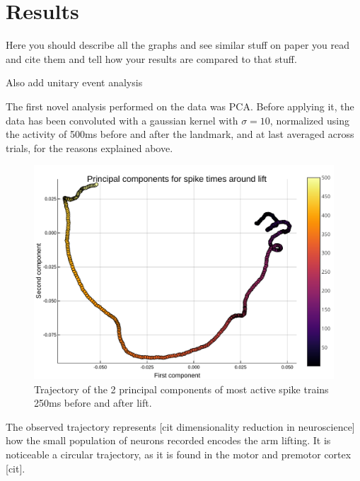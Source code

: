 \section{Results}

Here you should describe all the graphs and see similar stuff on paper you read and cite them and tell how your results are compared to that stuff.

Also add unitary event analysis


The first novel analysis performed on the data was PCA.	Before applying it, the data has been convoluted with a gaussian kernel with $\sigma=10$, normalized using the activity of 500ms before and after the landmark, and at last averaged across trials, for the reasons explained above.
\begin{figure}[h]
	\centering
	\includegraphics[scale=0.8]{../../plots/pca-500-lift.pdf}
	\caption{Trajectory of the 2 principal components of most active spike trains 250ms before and after lift. 
}
	\label{fig:pca-500}
\end{figure}

The observed trajectory represents [cit dimensionality reduction in neuroscience] how the small population of neurons recorded encodes the arm lifting. It is noticeable a circular trajectory, as it is found in the motor and premotor cortex [cit]. 

